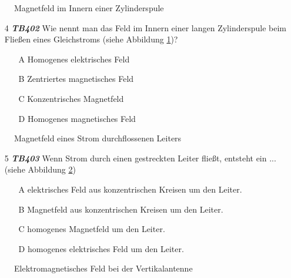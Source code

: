 \begin{figure}[H]
\centering

\caption{Magnetfeld im Innern einer Zylinderspule}
\label{MfeldSpule}
\end{figure}

\begin{enumerate} 
\itemsep1pt\parskip0pt
\item[4] \emph{\textbf{TB402}} Wie nennt man das Feld im Innern einer langen Zylinderspule beim Fließen eines Gleichstroms (siehe Abbildung \ref{MfeldSpule})?
	\begin{enumerate}
	\itemsep1pt\parskip0pt
		\item[A] Homogenes elektrisches Feld
		\item[B] Zentriertes magnetisches Feld
		\item[C] Konzentrisches Magnetfeld
		\item[D] Homogenes magnetisches Feld
	\end{enumerate}
\end{enumerate}

\begin{figure}[H]
\centering

\caption{Magnetfeld eines Strom durchflossenen Leiters}
\label{MfeldLeiter}
\end{figure}

\begin{enumerate} 
\itemsep1pt\parskip0pt
\item[5] \emph{\textbf{TB403}} Wenn Strom durch einen gestreckten Leiter fließt, entsteht ein ... (siehe Abbildung \ref{MfeldLeiter})
	\begin{enumerate}
	\itemsep1pt\parskip0pt
		\item[A] elektrisches Feld aus konzentrischen Kreisen um den Leiter.
		\item[B] Magnetfeld aus konzentrischen Kreisen um den Leiter.
		\item[C] homogenes Magnetfeld um den Leiter.
		\item[D] homogenes elektrisches Feld um den Leiter.
	\end{enumerate}
\end{enumerate}

\begin{figure}[H]
\centering

\caption{Elektromagnetisches Feld bei der Vertikalantenne}
\label{AntSchwingkreis_02}
\end{figure}

